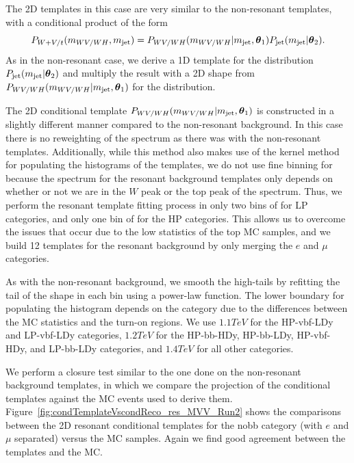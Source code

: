 The 2D templates in this case are very similar to the non-resonant templates, with a conditional product of the form
\begin{equation}
  P_{W+V/t}(m_{WV/WH},m_\mathrm{jet})=P_{WV/WH}(m_{WV/WH}|m_\mathrm{jet},\vb*{\theta}_1)P_\mathrm{jet}(m_\mathrm{jet}|\vb*{\theta}_2).
\end{equation}
As in the non-resonant case, we derive a 1D template for the \MJ distribution $P_\mathrm{jet}(m_\mathrm{jet}|\vb*{\theta}_2)$ and multiply the result with a 2D shape from $P_{WV/WH}(m_{WV/WH}|m_\mathrm{jet},\vb*{\theta}_1)$ for the \MVV distribution.

The 2D conditional template $P_{WV/WH}(m_{WV/WH}|m_\mathrm{jet},\vb*{\theta}_1)$ is constructed in a slightly different manner compared to the non-resonant background.
In this case there is no reweighting of the \MVV spectrum as there was with the non-resonant templates.
Additionally, while this method also makes use of the kernel method for populating the histograms of the templates, we do not use fine binning for \MJ because the \MVV spectrum for the resonant background templates only depends on whether or not we are in the $W$ peak or the top peak of the \MJ spectrum.
Thus, we perform the resonant template fitting process in only two bins of \MJ for LP categories, and only one bin of \MJ for the HP categories.
This allows us to overcome the issues that occur due to the low statistics of the top MC samples, and we build 12 templates for the resonant background by only merging the $e$ and $\mu$ categories.

As with the non-resonant background, we smooth the high-\MVV tails by refitting the tail of the \MVV shape in each \MJ bin using a power-law function.
The lower boundary for populating the histogram depends on the category due to the differences between the MC statistics and the turn-on regions.
We use $1.1\unit{TeV}$ for the HP-vbf-LDy and LP-vbf-LDy categories, $1.2\unit{TeV}$ for the HP-bb-HDy, HP-bb-LDy, HP-vbf-HDy, and LP-bb-LDy categories, and $1.4\unit{TeV}$ for all other categories.

We perform a closure test similar to the one done on the non-resonant background templates, in which we compare the \MVV projection of the conditional templates against the MC events used to derive them.
Figure~\ref{fig:condTemplateVscondReco_res_MVV_Run2} shows the comparisons between the 2D resonant conditional templates for the nobb category (with $e$ and $\mu$ separated) versus the MC samples.
Again we find good agreement between the templates and the MC.

